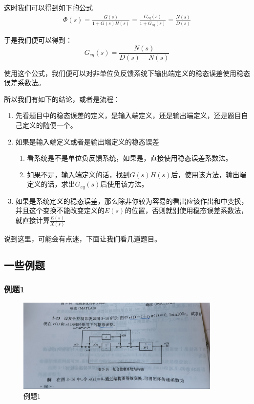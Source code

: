 \documentclass{ctexart}
\begin{document}
这时我们可以得到如下的公式
\begin{equation}
    \begin{aligned}
        \Phi(s) = \frac{G(s)}{1 + G(s)H(s)} = \frac{G_{eq}(s)}{1 + G_{eq}(s)} = \frac{N(s)}{D(s)}
    \end{aligned}
\end{equation}

于是我们便可以得到：
\begin{equation}
    G_{eq}(s) = \frac{N(s)}{D(s) - N(s)}
\end{equation}

使用这个公式，我们便可以对非单位负反馈系统下输出端定义的稳态误差使用稳态误差系数法。

所以我们有如下的结论，或者是流程：
\begin{enumerate}
    \item 先看题目中的稳态误差的定义，是输入端定义，还是输出端定义，还是题目自己定义的随便一个。
    \item 如果是输入端定义或者是输出端定义的稳态误差
          \begin{enumerate}
              \item 看系统是不是单位负反馈系统，如果是，直接使用稳态误差系数法。
              \item 如果不是，输入端定义的话，找到$G(s)H(s)$后，使用该方法，输出端定义的话，求出$G_{eq}(s)$后使用该方法。
          \end{enumerate}
    \item 如果是系统定义的稳态误差，那么除非你较为容易的看出应该作出和中变换，并且这个变换不能改变定义的$E(s)$的位置，否则就别使用稳态误差系数法，就直接计算$\frac{E(s)}{X(s)}$
\end{enumerate}

说到这里，可能会有点迷，下面让我们看几道题目。

\subsection*{一些例题}
\subsubsection*{例题1}
\begin{figure}[H]
    \centering
    \includegraphics[width=0.9\textwidth]{./pics/steady_state_error/example1.jpg}
    \caption{例题1}
    \label{Fig.4}
\end{figure}
\end{document}
